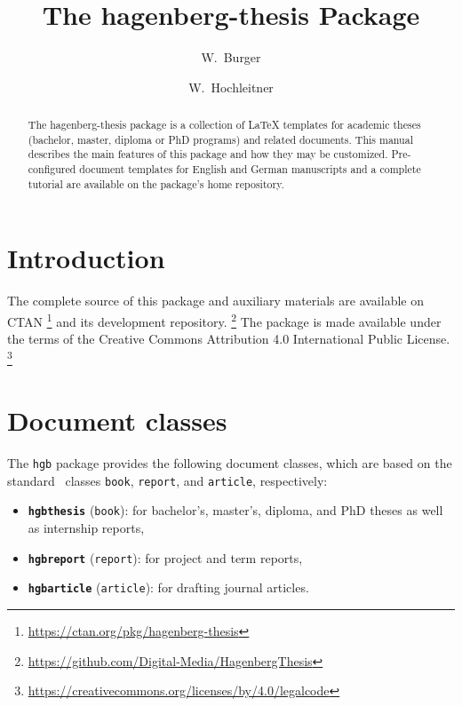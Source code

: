 \documentclass[language=english]{hgbarticle}
\begin{document}

\title{The \textsf{hagenberg-thesis} Package}
\date{\hgbDate}

\author{W.\ Burger}
\author{W.\ Hochleitner}

\maketitle

\begin{abstract}\noindent
The \textsf{hagenberg-thesis} package is a collection of LaTeX
templates for academic theses (bachelor, master, diploma or PhD programs) and
related documents. This manual describes the main features of this package
and how they may be customized.
Pre-configured document templates for English and German manuscripts and a
complete tutorial are available on the package's home repository.
\end{abstract}

\clearpage
\tableofcontents
\clearpage

\section{Introduction}

\makeatletter
\AB@authors
\makeatother

The complete source of this package and auxiliary materials are available on
CTAN%
\footnote{\url{https://ctan.org/pkg/hagenberg-thesis}}
and its development repository.%
\footnote{\url{https://github.com/Digital-Media/HagenbergThesis}}
The package is made available under the terms of the Creative Commons
Attribution 4.0 International Public License.%
\footnote{\url{https://creativecommons.org/licenses/by/4.0/legalcode}}


\section{Document classes}

The \texttt{hgb} package provides the following document classes, which are
based on the standard \latex\ classes \texttt{book}, \texttt{report}, and
\texttt{article}, respectively:
%
\begin{itemize}
    \item \textbf{\texttt{hgbthesis}} (\texttt{book}):
    for bachelor's, master's, diploma, and PhD theses as well as internship reports,
    \item \textbf{\texttt{hgbreport}} (\texttt{report}):
    for project and term reports,
    \item \textbf{\texttt{hgbarticle}} (\texttt{article}):
    for drafting journal articles.
\end{itemize}
\end{document}
